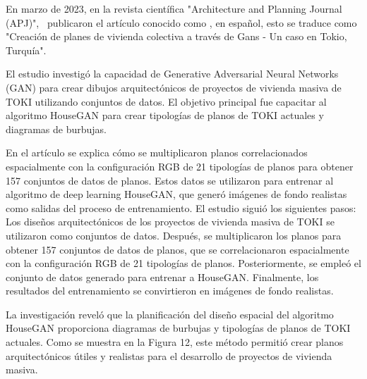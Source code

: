En marzo de 2023, en la revista científica "Architecture and Planning Journal (APJ)", \cite{pr_ozerol2023genermass} publicaron el artículo conocido como , en español, esto se traduce como "Creación de planes de vivienda colectiva a través de Gans - Un caso en Tokio, Turquía".

El estudio investigó la capacidad de Generative Adversarial Neural Networks (GAN) para crear dibujos arquitectónicos de proyectos de vivienda masiva de TOKI utilizando conjuntos de datos. El objetivo principal fue capacitar al algoritmo HouseGAN para crear tipologías de planos de TOKI actuales y diagramas de burbujas.

En el artículo se explica cómo se multiplicaron planos correlacionados espacialmente con la configuración RGB de 21 tipologías de planos para obtener 157 conjuntos de datos de planos. Estos datos se utilizaron para entrenar al algoritmo de deep learning HouseGAN, que generó imágenes de fondo realistas como salidas del proceso de entrenamiento. El estudio siguió los siguientes pasos: Los diseños arquitectónicos de los proyectos de vivienda masiva de TOKI se utilizaron como conjuntos de datos. Después, se multiplicaron los planos para obtener 157 conjuntos de datos de planos, que se correlacionaron espacialmente con la configuración RGB de 21 tipologías de planos. Posteriormente, se empleó el conjunto de datos generado para entrenar a HouseGAN. Finalmente, los resultados del entrenamiento se convirtieron en imágenes de fondo realistas.

La investigación reveló que la planificación del diseño espacial del algoritmo HouseGAN proporciona diagramas de burbujas y tipologías de planos de TOKI actuales. Como se muestra en la Figura 12, este método permitió crear planos arquitectónicos útiles y realistas para el desarrollo de proyectos de vivienda masiva.

